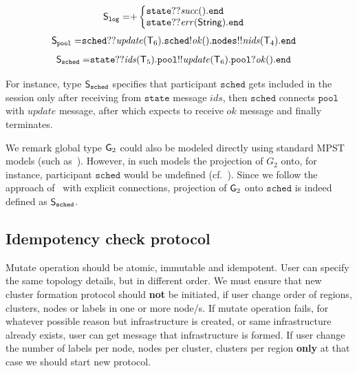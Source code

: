 \begin{align*}
	\ST_\mathtt{log} =& 
	{+}
	\left\{
	\begin{array}{@{}l@{}}
	\mathtt{state}{??}\mathit{succ}().\tend\\
	\mathtt{state}{??}\mathit{err}(\mathsf{String}).\tend
	\end{array} \right.
\end{align*}
\begin{align*}
	{\mathsf S}_\mathtt{pool} =&
	\mathtt{sched}{??}\mathit{update}({\mathsf T}_6).
	\mathtt{sched}{!}\mathit{ok}(). 
	\mathtt{nodes}{!!}\mathit{nids}({\mathsf T}_4).\mathtt{end}
\end{align*}
\begin{align*}
	{\mathsf S}_\mathtt{sched} =& 
	\mathtt{state}{??}\mathit{ids}({\mathsf T}_5).
	\mathtt{pool}{!!}\mathit{update}({\mathsf T}_6).
	\mathtt{pool}{?}\mathit{ok}().\mathtt{end}
\end{align*}

For instance, type ${\mathsf S}_\mathtt{sched}$ specifies that participant $\mathtt{sched}$ gets included in the session only after receiving from $\mathtt{state}$ message $\mathit{ids}$, then $\mathtt{sched}$ connects $\mathtt{pool}$ with $\mathit{update}$ message, after which expects to receive $\mathit{ok}$ message and finally terminates. 

We remark global type ${\sf G}_2$ could also be modeled directly using standard MPST models (such as~\cite{HondaYC08}). However, in such models the projection of $G_2$ onto, for instance, participant $\mathtt{sched}$ would be undefined (cf.~\cite{HuY17}).
Since we follow the approach of~\cite{HuY17} with explicit connections, projection of ${\sf G}_2$ onto $\mathtt{sched}$ is indeed defined as ${\mathsf S}_\mathtt{sched}$.
%
%
\subsection{Idempotency check protocol}\label{sec:idempotency_protocol}
%
Mutate operation should be atomic, immutable and idempotent. User can specify the same topology details, but in different order. We must ensure that new cluster formation protocol should \textbf{not} be initiated, if user change order of regions, clusters, nodes or labels in one or more node/s. If mutate operation fails, for whatever possible reason but infrastructure is created, or same infrastructure already exists, user can get message that infrastructure is formed. If user change the number of labels per node, nodes per cluster, clusters per region \textbf{only} at that case we should start new protocol.


